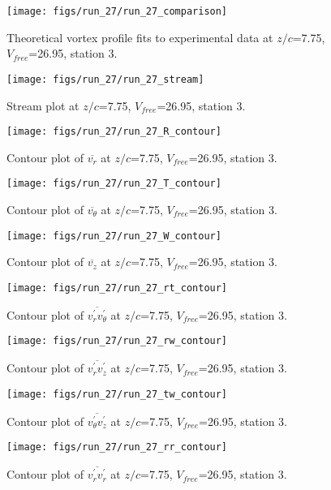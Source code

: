 \begin{figure}[H]
\centering
\texttt{[image: figs/run\_27/run\_27\_comparison]}
\caption{Theoretical vortex profile fits to experimental data at $z/c$=7.75, $V_{free}$=26.95, station 3.}
\end{figure}


\begin{figure}[H]
\centering
\texttt{[image: figs/run\_27/run\_27\_stream]}
\caption{Stream plot at $z/c$=7.75, $V_{free}$=26.95, station 3.}
\end{figure}


\begin{figure}[H]
\centering
\texttt{[image: figs/run\_27/run\_27\_R\_contour]}
\caption{Contour plot of $\overline{v_{r}}$ at $z/c$=7.75, $V_{free}$=26.95, station 3.}
\end{figure}


\begin{figure}[H]
\centering
\texttt{[image: figs/run\_27/run\_27\_T\_contour]}
\caption{Contour plot of $\overline{v_{\theta}}$ at $z/c$=7.75, $V_{free}$=26.95, station 3.}
\end{figure}


\begin{figure}[H]
\centering
\texttt{[image: figs/run\_27/run\_27\_W\_contour]}
\caption{Contour plot of $\overline{v_{z}}$ at $z/c$=7.75, $V_{free}$=26.95, station 3.}
\end{figure}


\begin{figure}[H]
\centering
\texttt{[image: figs/run\_27/run\_27\_rt\_contour]}
\caption{Contour plot of $\overline{v_{r}^{\prime} v_{\theta}^{\prime}}$ at $z/c$=7.75, $V_{free}$=26.95, station 3.}
\end{figure}


\begin{figure}[H]
\centering
\texttt{[image: figs/run\_27/run\_27\_rw\_contour]}
\caption{Contour plot of $\overline{v_{r}^{\prime} v_{z}^{\prime}}$ at $z/c$=7.75, $V_{free}$=26.95, station 3.}
\end{figure}


\begin{figure}[H]
\centering
\texttt{[image: figs/run\_27/run\_27\_tw\_contour]}
\caption{Contour plot of $\overline{v_{\theta}^{\prime} v_{z}^{\prime}}$ at $z/c$=7.75, $V_{free}$=26.95, station 3.}
\end{figure}


\begin{figure}[H]
\centering
\texttt{[image: figs/run\_27/run\_27\_rr\_contour]}
\caption{Contour plot of $\overline{v_{r}^{\prime} v_{r}^{\prime}}$ at $z/c$=7.75, $V_{free}$=26.95, station 3.}
\end{figure}



